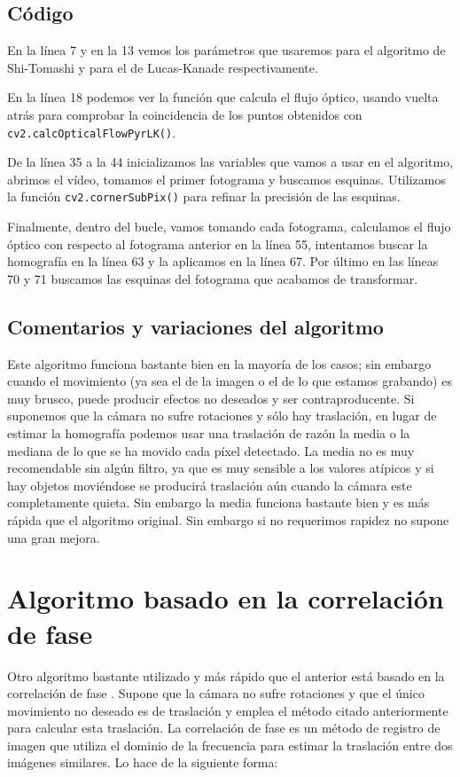 \documentclass[a4paper,openright, 12pt]{book}
\begin{document}
\subsection{Código}

En la línea 7 y en la 13 vemos los parámetros que usaremos para el algoritmo de Shi-Tomashi y para el de Lucas-Kanade respectivamente.

En la línea 18 podemos ver la función que calcula el flujo óptico, usando vuelta atrás para comprobar la coincidencia de los puntos obtenidos con \lstinline|cv2.calcOpticalFlowPyrLK()|.

De la línea 35 a la 44 inicializamos las variables que vamos a usar en el algoritmo, abrimos el vídeo, tomamos el primer fotograma y buscamos esquinas. Utilizamos la función \lstinline|cv2.cornerSubPix()| para refinar la precisión de las esquinas.

Finalmente, dentro del bucle, vamos tomando cada fotograma, calculamos el flujo óptico con respecto al fotograma anterior en la línea 55, intentamos buscar la homografía en la línea 63 y la aplicamos en la línea 67. Por último en las líneas 70 y 71 buscamos las esquinas del fotograma que acabamos de transformar.
 
\subsection{Comentarios y variaciones del algoritmo}
Este algoritmo funciona bastante bien en la mayoría de los casos; sin embargo cuando el movimiento (ya sea el de la imagen o el de lo que estamos grabando) es muy brusco, puede producir efectos no deseados y ser contraproducente. Si suponemos que la cámara no sufre rotaciones y sólo hay traslación, en lugar de estimar la homografía podemos usar una traslación de razón la media o la mediana de lo que se ha movido cada píxel detectado. La media no es muy recomendable sin algún filtro, ya que es muy sensible a los valores atípicos y si hay objetos moviéndose se producirá traslación aún cuando la cámara este completamente quieta. Sin embargo la media funciona bastante bien y es más rápida que el algoritmo original. Sin embargo si no requerimos rapidez no supone una gran mejora.
\newpage
\section{Algoritmo basado en la correlación de fase}
Otro algoritmo bastante utilizado y más rápido que el anterior está basado en la correlación de fase \cite{kug75}. Supone que la cámara no sufre rotaciones y que el único movimiento no deseado es de traslación y emplea el método citado anteriormente para calcular esta traslación.
\newline
La correlación de fase es un método de registro de imagen que utiliza el dominio de la frecuencia para estimar la traslación entre dos imágenes similares. Lo hace de la siguiente forma:
\end{document}
